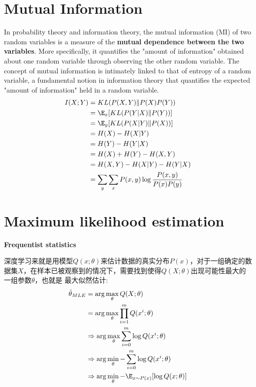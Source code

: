 \section{Mutual Information}
In probability theory and information theory, the mutual information (MI) of two random variables is a
measure of the \textbf{mutual dependence between the two variables}. More specifically, it quantifies the "amount of information"
obtained about one random variable through observing the other random variable. The concept of mutual information is
intimately linked to that of entropy of a random variable, a fundamental notion in information theory that quantifies
the expected "amount of information" held in a random variable.
\begin{equation}
    \begin{split}
        I(X;Y)
        &= KL(P(X,Y)\|P(X)P(Y)) \\
        &= \E_x[KL(P(Y|X)\|P(Y))] \\
        &= \E_y[KL(P(X|Y)\|P(X))] \\
        &= H(X) - H(X|Y) \\
        &= H(Y) - H(Y|X) \\
        &= H(X) + H(Y) - H(X, Y) \\
        &= H(X, Y) - H(X|Y) - H(Y|X) \\
        &= \sum_y\sum_x P(x, y) \log \frac{P(x, y)}{P(x)P(y)}
    \end{split}
\end{equation}


\section{Maximum likelihood estimation}
\textbf{Frequentist statistics}

深度学习来就是用模型$Q(x;\theta)$来估计数据的真实分布$P(x)$，对于一组确定的数据集$X$，在样本已被观察到的情况下，需要找到使得$Q(X; \theta)$出现可能性最大的一组参数$\theta$，也就是
最大似然估计:
\begin{equation}
    \begin{split}
        \hat{\theta}_{MLE}
        &= \arg \max_\theta Q(X; \theta) \\
        &= \arg \max_{\theta} \prod _{i=1}^m Q(x^i; \theta) \\
        &\Rightarrow \arg \max_{\theta} \sum_{i=0}^m \log Q(x^i; \theta) \\
        &\Rightarrow \arg \min_{\theta} - \sum_{i=0}^m \log Q(x^i; \theta) \\
        &\Rightarrow \arg \min_{\theta} - \E _{x \sim P(x)}[\log Q(x; \theta)]
    \end{split}
\end{equation}


